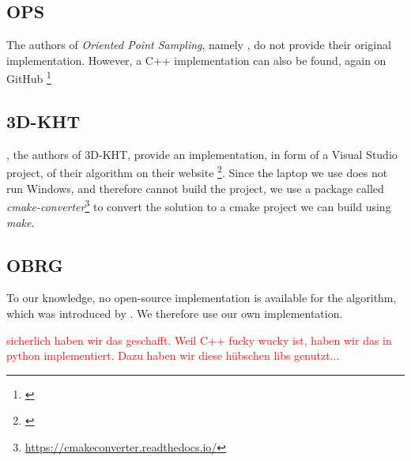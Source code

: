 \documentclass[main.tex]{subfiles}
\begin{document}
\subsection*{OPS}
The authors of \textit{Oriented Point Sampling}, namely \citeauthor{Sun_Mordohai_2019}, do not provide their original implementation. 
However, a C++ implementation can also be found, again on GitHub \footnote{\href{https://github.com/victor-amblard/OrientedPointSampling}{}}

\subsection*{3D-KHT}
\citeauthor{Limberger_Oliveira_2015}, the authors of 3D-KHT, provide an implementation, in form of a Visual Studio project, of their algorithm on their website \footnote{\href{https://www.inf.ufrgs.br/~oliveira/pubs_files/HT3D/HT3D_page.html}
{}}. Since the laptop we use does not run Windows, and therefore cannot build the project, we use a package called 
\textit{cmake-converter}\footnote{\href{https://cmakeconverter.readthedocs.io/en/latest/use.html}{https://cmakeconverter.readthedocs.io/}} to convert the solution to a cmake project we can build using \textit{make}.

\subsection*{OBRG}
To our knowledge, no open-source implementation is available for the algorithm, which was introduced by \citeauthor{Vo_Truong-Hong_Laefer_Bertolotto_2015}\cite{Vo_Truong-Hong_Laefer_Bertolotto_2015}.
We therefore use our own implementation.

\textcolor{red}{sicherlich haben wir das geschafft. Weil C++ fucky wucky ist, haben wir das in python implementiert. Dazu haben wir diese hübschen libs genutzt...} 
\end{document}
